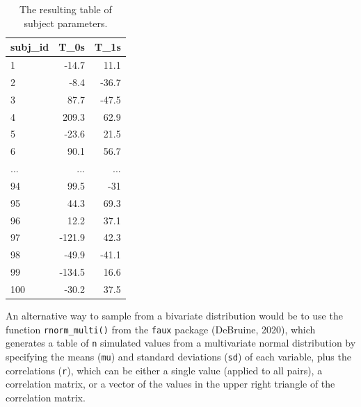 \documentclass[
  english,
  doc,floatsintext]{apa6}
\begin{document}
\begin{table}[H]

\begin{center}
\begin{threeparttable}

\caption{\label{tab:subj-table}The resulting table of subject parameters.}

\begin{tabular}{lrr}
\toprule
subj\_id & \multicolumn{1}{c}{T\_0s} & \multicolumn{1}{c}{T\_1s}\\
\midrule
1 & -14.7 & 11.1\\
2 & -8.4 & -36.7\\
3 & 87.7 & -47.5\\
4 & 209.3 & 62.9\\
5 & -23.6 & 21.5\\
6 & 90.1 & 56.7\\
... & ... & ...\\
94 & 99.5 & -31\\
95 & 44.3 & 69.3\\
96 & 12.2 & 37.1\\
97 & -121.9 & 42.3\\
98 & -49.9 & -41.1\\
99 & -134.5 & 16.6\\
100 & -30.2 & 37.5\\
\bottomrule
\end{tabular}

\end{threeparttable}
\end{center}

\end{table}

An alternative way to sample from a bivariate distribution would be to use the function \texttt{rnorm\_multi()} from the \texttt{faux} package (DeBruine, 2020), which generates a table of \texttt{n} simulated values from a multivariate normal distribution by specifying the means (\texttt{mu}) and standard deviations (\texttt{sd}) of each variable, plus the correlations (\texttt{r}), which can be either a single value (applied to all pairs), a correlation matrix, or a vector of the values in the upper right triangle of the correlation matrix.
\end{document}
